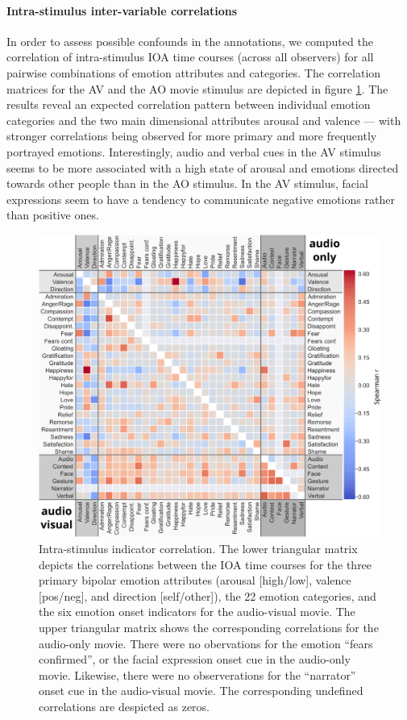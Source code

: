 \documentclass[10pt,a4paper,twocolumn]{article}
\begin{document}
\paragraph{Intra-stimulus inter-variable correlations}

In order to assess possible confounds in the annotations, we computed the
correlation of intra-stimulus IOA time courses (across all observers) for all
pairwise combinations of emotion attributes and categories. The correlation
matrices for the AV and the AO movie stimulus are depicted in figure
\ref{fig:intrastimcorrelation}. The results reveal an expected correlation
pattern between individual emotion categories and the two main dimensional
attributes arousal and valence --- with stronger correlations being observed for
more primary and more frequently portrayed emotions. Interestingly, audio and
verbal cues in the AV stimulus seems to be more associated with a high state of
arousal and emotions directed towards other people than in the AO stimulus. In
the AV stimulus, facial expressions seem to have a tendency to communicate
negative emotions rather than positive ones.


\begin{figure}
  \centering
  \includegraphics[width=\linewidth]{figures/bigcorr}
  \caption{Intra-stimulus indicator correlation. The lower triangular matrix
    depicts the correlations between the IOA time courses for
    the three primary bipolar emotion attributes (arousal [high/low], valence [pos/neg], and direction [self/other]), the
    22 emotion categories, and the six emotion onset indicators for the audio-visual
    movie. The upper triangular matrix shows the corresponding correlations for the
    audio-only movie. There were no obervations for the emotion ``fears confirmed'', or the facial expression onset cue in the audio-only movie. Likewise, there were no observerations for the ``narrator'' onset cue in the audio-visual movie. The corresponding undefined correlations are despicted as zeros.
 }
  \label{fig:intrastimcorrelation}
\end{figure}
\end{document}
